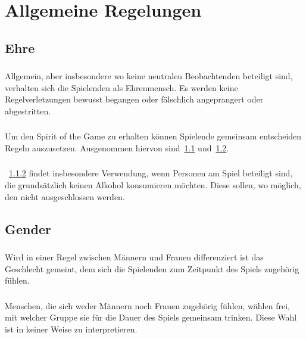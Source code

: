 \section{Allgemeine Regelungen}\label{Allgemeine_Regelungen}

\subsection{Ehre}\label{Allgemeine_Regelungen:Ehre}
\subsubsection{} Allgemein, aber insbesondere wo keine neutralen Beobachtenden beteiligt sind, verhalten sich die Spielenden als Ehrenmensch.
Es werden keine Regelverletzungen bewusst begangen oder fälschlich angeprangert oder abgestritten.

\subsubsection{}\label{Allgemeine_Regelungen:Ehre:Spirit}
Um den \glqq{} Spirit of the Game\grqq{} zu erhalten können Spielende gemeinsam entscheiden Regeln auszusetzen.
Ausgenommen hiervon sind~\ref{Allgemeine_Regelungen:Ehre} und~\ref{Allgemeine_Regelungen:Gender}.

\subsubsection{}
~\ref{Allgemeine_Regelungen:Ehre:Spirit} findet insbesondere Verwendung, wenn Personen am Spiel beteiligt sind, die grundsätzlich keinen Alkohol konsumieren möchten.
Diese sollen, wo möglich, den nicht ausgeschlossen werden.

\subsection{Gender}\label{Allgemeine_Regelungen:Gender}
\subsubsection{}
Wird in einer Regel zwischen Männern und Frauen differenziert ist das Geschlecht gemeint, dem sich die Spielenden zum Zeitpunkt des Spiels zugehörig fühlen.

\subsubsection{}
Menschen, die sich weder Männern noch Frauen zugehörig fühlen, wählen frei, mit welcher Gruppe sie für die Dauer des Spiels gemeinsam trinken.
Diese Wahl ist in keiner Weise zu interpretieren.


